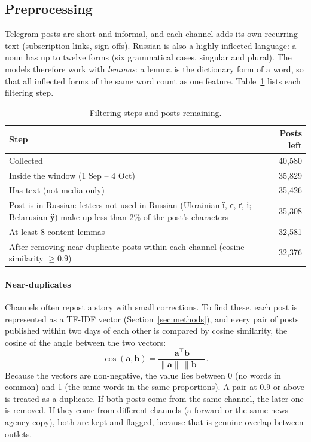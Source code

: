 \documentclass[11pt,a4paper]{article}
\begin{document}
\subsection{Preprocessing}
Telegram posts are short and informal, and each channel adds its own recurring text (subscription links, sign-offs). Russian is also a highly inflected language: a noun has up to twelve forms (six grammatical cases, singular and plural). The models therefore work with \emph{lemmas}: a lemma is the dictionary form of a word, so that all inflected forms of the same word count as one feature. Table~\ref{tab:cleaning} lists each filtering step.

\begin{table}[H]
\centering
\small
\caption{Filtering steps and posts remaining.}
\label{tab:cleaning}
\begin{tabularx}{\textwidth}{Xr}
\toprule
Step & Posts left \\
\midrule
Collected & 40,580 \\
Inside the window (1 Sep -- 4 Oct) & 35,829 \\
Has text (not media only) & 35,426 \\
Post is in Russian: letters not used in Russian (Ukrainian ї, є, ґ, і; Belarusian ў) make up less than 2\% of the post's characters & 35,308 \\
At least 8 content lemmas & 32,581 \\
After removing near-duplicate posts within each channel (cosine similarity $\geq 0.9$) & 32,376 \\
\bottomrule
\end{tabularx}
\end{table}

\paragraph{Near-duplicates} Channels often repost a story with small corrections. To find these, each post is represented as a TF-IDF vector (Section~\ref{sec:methods}), and every pair of posts published within two days of each other is compared by cosine similarity, the cosine of the angle between the two vectors:
\begin{equation}
\cos(\mathbf{a}, \mathbf{b}) = \frac{\mathbf{a}^\top\mathbf{b}}{\lVert\mathbf{a}\rVert\,\lVert\mathbf{b}\rVert}.
\end{equation}
Because the vectors are non-negative, the value lies between 0 (no words in common) and 1 (the same words in the same proportions). A pair at 0.9 or above is treated as a duplicate. If both posts come from the same channel, the later one is removed. If they come from different channels (a forward or the same news-agency copy), both are kept and flagged, because that is genuine overlap between outlets.
\end{document}
